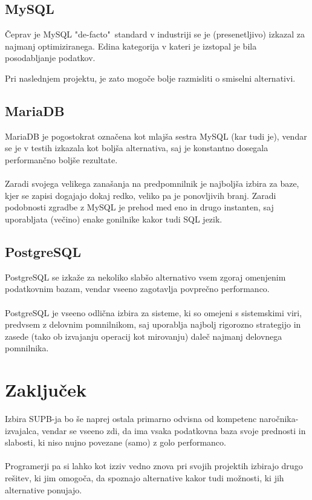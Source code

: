 \documentclass[a4paper,11pt]{report}
\begin{document}
\subsection{MySQL}
Čeprav je MySQL "de-facto"\ standard v industriji se je (presenetljivo) izkazal za najmanj optimiziranega.
Edina kategorija v kateri je izstopal je bila posodabljanje podatkov. 

Pri naslednjem projektu, je zato mogoče bolje razmisliti o smiselni alternativi.

\subsection{MariaDB}
MariaDB je pogostokrat označena kot mlajša sestra MySQL (kar tudi je), vendar se je v testih izkazala kot boljša alternativa, saj je konstantno dosegala performančno boljše rezultate.
\\\\
Zaradi svojega velikega zanašanja na predpomnilnik je najboljša izbira za baze, kjer se zapisi dogajajo dokaj redko, veliko pa je ponovljivih branj.
Zaradi podobnosti zgradbe z MySQL je prehod med eno in drugo instanten, saj uporabljata (večino) enake gonilnike kakor
tudi SQL jezik.

\pagebreak

\subsection{PostgreSQL}
PostgreSQL se izkaže za nekoliko slabšo alternativo vsem zgoraj omenjenim podatkovnim bazam, vendar vseeno zagotavlja povprečno performanco.
\\\\
PostgreSQL je vseeno odlična izbira za sisteme, ki so omejeni s sistemskimi viri, predvsem z delovnim pomnilnikom, saj uporablja najbolj rigorozno strategijo in zasede (tako ob izvajanju operacij kot mirovanju) daleč najmanj delovnega pomnilnika.

\section{Zaključek}
Izbira SUPB-ja bo še naprej ostala primarno odvisna od kompetenc naročnika-izvajalca, vendar se vseeno zdi, da ima vsaka podatkovna baza svoje prednosti in slabosti, ki niso nujno povezane (samo) z golo performanco.
\\\\
Programerji pa si lahko kot izziv vedno znova pri svojih projektih izbirajo drugo rešitev, ki jim omogoča, da spoznajo alternative kakor tudi možnosti, ki jih alternative ponujajo.
\end{document}
